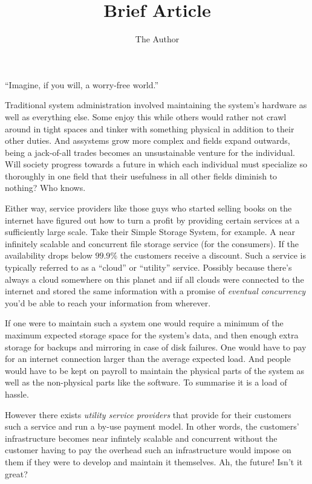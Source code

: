 \documentclass[11pt]{article}
\title{Brief Article}
\author{The Author}
\begin{document}
\maketitle


``Imagine, if you will, a worry-free world.''


Traditional system administration involved maintaining the system's hardware as well as everything else.
Some enjoy this while others would rather not crawl around in tight spaces and tinker with something physical in addition to their other duties.
And assystems grow more complex and fields expand outwards, being a jack-of-all trades becomes an unsustainable venture for the individual.
Will society progress towards a future in which each individual must specialize so thoroughly in one field that their usefulness in all other fields diminish to nothing?
Who knows.

Either way, service providers like those guys who started selling books on the internet have figured out how to turn a profit by providing certain services at a sufficiently large scale.
Take their Simple Storage System, for example.
A near infinitely scalable and concurrent file storage service (for the consumers).
If the availability drops below $99.9\%$ the customers receive a discount.
Such a service is typically referred to as a ``cloud'' or ``utility'' service.
Possibly because there's always a cloud somewhere on this planet and iif all clouds were connected to the internet and stored the same information with a promise of \textit{eventual concurrency} you'd be able to reach your information from wherever.

If one were to maintain such a system one would require a minimum of the maximum expected storage space for the system's data, and then enough extra storage for backups and mirroring in case of disk failures.
One would have to pay for an internet connection larger than the average expected load.
And people would have to be kept on payroll to maintain the physical parts of the system as well as the non-physical parts like the software.
To summarise it is a load of hassle.

However there exists \textit{utility service providers} that provide for their customers such a service and run a by-use payment model.
In other words, the customers' infrastructure becomes near infintely scalable and concurrent without the customer having to pay the overhead such an infrastructure would impose on them if they were to develop and maintain it themselves.
Ah, the future! Isn't it great?
\end{document}
